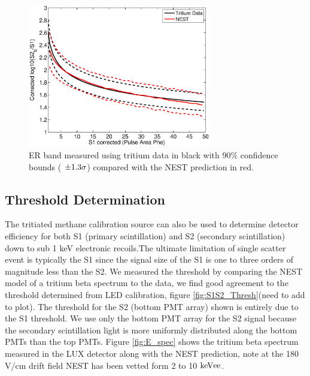 \begin{figure}[h!]\centering
\includegraphics[width=80mm]{CH3T_DATA_NEST_fid_30_LUX_SIM_Tritium.eps}
\caption{ER band measured using tritium data in black with 90\% confidence bounds ( $\rm \pm 1.3 \sigma$) compared with the NEST prediction in red.}
\label{fig:NEST_v_Data}
\end{figure}


\subsection{Threshold Determination}

The tritiated methane calibration source can also be used to determine detector efficiency for both S1 (primary scintillation) and S2 (secondary scintillation) down to sub 1 keV electronic recoils.The ultimate limitation of single scatter event is typically the S1 since the signal size of the S1 is one to three orders of magnitude less than the S2. We measured the threshold by comparing the NEST model of a tritium beta spectrum to the data, we find good agreement to the threshold determined from LED calibration, figure \ref{fig:S1S2_Thresh}(need to add to plot). The threshold for the S2 (bottom PMT array) shown is entirely due to the S1 threshold. We use only the bottom PMT array for the S2 signal because the secondary scintillation light is more uniformly distributed along the bottom PMTs than the top PMTs. Figure \ref{fig:E_spec} shows the tritium beta spectrum measured in the LUX detector along with the NEST prediction, note at the 180 V/cm drift field NEST has been vetted form 2 to 10 $\rm keV{ee}$.

